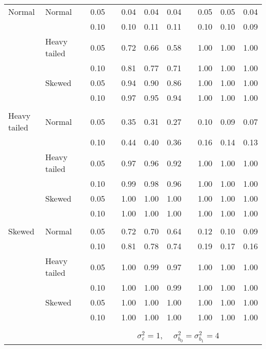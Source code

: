 \begin{table}[ht]
\begin{scriptsize}
\begin{center}
\begin{tabular}{ll p{.1cm} c p{.1cm} rrr p{.1cm} rrr}
\rowcolor{gray!20}Normal       & Normal       && 0.05 &&   0.04 & 0.04 & 0.04 && 0.05 & 0.05 & 0.04 \\ 
\rowcolor{gray!20}             &              && 0.10 &&   0.10 & 0.11 & 0.11 && 0.10 & 0.10 & 0.09 \\ 
\rowcolor{gray!20}             & Heavy tailed && 0.05 &&   0.72 & 0.66 & 0.58 && 1.00 & 1.00 & 1.00 \\ 
\rowcolor{gray!20}             &              && 0.10 &&   0.81 & 0.77 & 0.71 && 1.00 & 1.00 & 1.00 \\ 
\rowcolor{gray!20}             & Skewed       && 0.05 &&   0.94 & 0.90 & 0.86 && 1.00 & 1.00 & 1.00 \\ 
\rowcolor{gray!20}             &              && 0.10 &&   0.97 & 0.95 & 0.94 && 1.00 & 1.00 & 1.00 \\ 
             &&&&&&&&&&&\\
Heavy tailed & Normal       && 0.05 &&   0.35 & 0.31 & 0.27 && 0.10 & 0.09 & 0.07 \\ 
             &              && 0.10 &&   0.44 & 0.40 & 0.36 && 0.16 & 0.14 & 0.13 \\ 
             & Heavy tailed && 0.05 &&   0.97 & 0.96 & 0.92 && 1.00 & 1.00 & 1.00 \\ 
             &              && 0.10 &&   0.99 & 0.98 & 0.96 && 1.00 & 1.00 & 1.00 \\ 
             & Skewed       && 0.05 &&   1.00 & 1.00 & 1.00 && 1.00 & 1.00 & 1.00 \\ 
             &              && 0.10 &&   1.00 & 1.00 & 1.00 && 1.00 & 1.00 & 1.00 \\
             &&&&&&&&&&&\\ 
Skewed       & Normal       && 0.05 &&   0.72 & 0.70 & 0.64 && 0.12 & 0.10 & 0.09 \\ 
             &              && 0.10 &&   0.81 & 0.78 & 0.74 && 0.19 & 0.17 & 0.16 \\ 
             & Heavy tailed && 0.05 &&   1.00 & 0.99 & 0.97 && 1.00 & 1.00 & 1.00 \\ 
             &              && 0.10 &&   1.00 & 1.00 & 0.99 && 1.00 & 1.00 & 1.00 \\ 
             & Skewed       && 0.05 &&   1.00 & 1.00 & 1.00 && 1.00 & 1.00 & 1.00 \\ 
             &              && 0.10 &&   1.00 & 1.00 & 1.00 && 1.00 & 1.00 & 1.00 \\ 



&&&&&&&&&&&\\
& && && \multicolumn{6}{c}{$\sigma_{\varepsilon}^2 = 1$, \ \ $\sigma_{b_0}^2 = \sigma_{b_1}^2 = 4$} \\ \cline{6-12}


\end{tabular}
\end{center}
\end{scriptsize}
\end{table}
